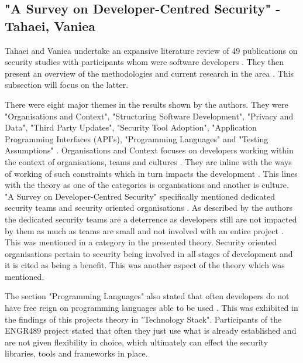 \subsection{"A Survey on Developer-Centred Security" - Tahaei, Vaniea}

\par Tahaei and Vaniea undertake an expansive literature review of 49 publications on security studies with participants whom were software developers \cite{dev}. They then present an overview of the methodologies and current research in the area \cite{dev}. This subsection will focus on the latter. 
\newline
\par 
There were eight major themes in the results shown by the authors. They were "Organisations and Context", "Structuring Software Development", "Privacy and Data", "Third Party Updates", "Security Tool Adoption", "Application Programming Interfaces (API's), "Programming Languages" and "Testing Assumptions" \cite{dev}. Organisations and Context focuses on developers working within the context of organisations, teams and cultures \cite{dev}. They are inline with the ways of working of such constraints which in turn impacts the development \cite{dev}. This lines with the theory as one of the categories is organisations and another is culture. "A Survey on Developer-Centred Security" specifically mentioned dedicated security teams and security oriented organisations \cite{dev}. As described by the authors the dedicated security teams are a deterrence as developers still are not impacted by them as much as teams are small and not involved with an entire project \cite{dev}. This was mentioned in a category in the presented theory. Security oriented organisations pertain to security being involved in all stages of development and it is cited as being a benefit. This was another aspect of the theory which was mentioned. 
\newline
\par 
The section "Programming Languages" also stated that often developers do not have free reign on programming languages able to be used \cite{dev}. This was exhibited in the findings of this projects theory in "Technology Stack". Participants of the ENGR489 project stated that often they just use what is already established and are not given flexibility in choice, which ultimately can effect the security libraries, tools and frameworks in place. 
